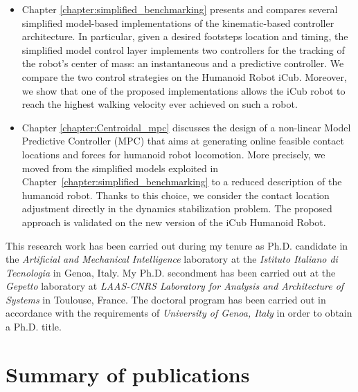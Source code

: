 \begin{itemize}
    \item Chapter \ref{chapter:simplified_benchmarking} presents and compares several simplified model-based implementations of the kinematic-based controller architecture. In particular, given a desired footsteps location and timing, the simplified model control layer implements two controllers for the tracking of the robot's center of mass: an instantaneous and a predictive controller. We compare the two control strategies on the Humanoid Robot iCub. Moreover, we show that one of the proposed implementations allows the iCub robot to reach the highest walking velocity ever achieved on such a robot.
    \item Chapter \ref{chapter:Centroidal_mpc} discusses the design of a non-linear Model Predictive Controller (MPC) that aims at generating online feasible contact locations and forces for humanoid robot locomotion. More precisely, we moved from the simplified models exploited in Chapter~\ref{chapter:simplified_benchmarking} to a reduced description of the humanoid robot. Thanks to this choice, we consider the contact location adjustment directly in the dynamics stabilization problem. The proposed approach is validated on the new version of the iCub Humanoid Robot.
\end{itemize}

This research work has been carried out during my tenure as Ph.D. candidate in the \emph{Artificial and Mechanical Intelligence} laboratory at the \emph{Istituto Italiano di Tecnologia} in Genoa, Italy.
My Ph.D. secondment has been carried out at the \emph{Gepetto} laboratory at \emph{LAAS-CNRS Laboratory for Analysis and Architecture of Systems} in Toulouse, France.
The doctoral program has been carried out in accordance with the requirements of \emph{University
of Genoa, Italy} in order to obtain a Ph.D. title.

\section*{Summary of publications}
\nobibliography*


